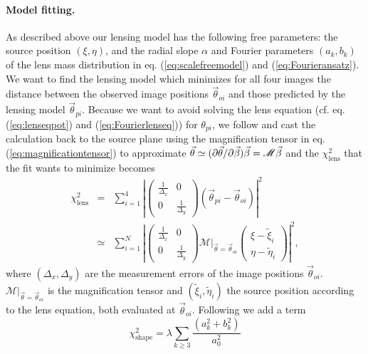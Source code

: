 \paragraph{Model fitting.} As described above our lensing model has the following free parameters: the source position $(\xi,\eta)$, and the radial slope $\alpha$ and Fourier parameters $(a_k,b_k)$ of the lens mass distribution in eq. (\ref{eq:scalefreemodel}) and (\ref{eq:Fourieransatz}). We want to find the lensing model which minimizes for all four images the distance between the observed image positions $\vec{\theta}_{oi}$ and those predicted by the lensing model $\vec{\theta}_{pi}$. Because we want to avoid solving the lens equation (cf. eq. (\ref{eq:lenseqpot}) and (\ref{eq:Fourierlenseq})) for $\theta_{pi}$, we follow \citet{1991ApJ...373..354K} and cast the calculation back to the source plane using the magnification tensor in eq. (\ref{eq:magnificationtensor}) to approximate $\vec{\theta} \simeq (\partial \vec{\theta} / \partial \vec{\beta}) \vec{\beta} = \mathscr{M} \vec{\beta} $ and the $\chi^2_\text{lens}$ that the fit wants to minimize becomes
\begin{eqnarray*}
\chi^2_\text{lens} &=& \sum_{i=1}^{4} \left|\left( \begin{matrix} \frac{1}{\Delta_x} & 0\\0 & \frac{1}{\Delta_y}\end{matrix}\right) \left( \vec{\theta}_{pi} - \vec{\theta}_{oi} \right)\right|^2\\
&\simeq& \sum_{i=1}^{N} \left|\left( \begin{matrix} \frac{1}{\Delta_x} & 0\\0 & \frac{1}{\Delta_y}\end{matrix}\right)  \left.\mathscr{M}\right|_{\vec{\theta}=\vec{\theta}_{oi}} \left( \begin{matrix} \xi - \tilde{\xi}_i \\ \eta - \tilde{\eta}_i \end{matrix} \right) \right|^2,
\end{eqnarray*}
where $(\Delta_x,\Delta_y)$ are the measurement errors of the image positions $\vec{\theta}_{oi}$. $\left.\mathscr{M}\right|_{\vec{\theta}=\vec{\theta}_{oi}}$ is the magnification tensor and $(\tilde{\xi}_i,\tilde{\eta}_i)$ the source position according to the lens equation, both evaluated at $\vec{\theta}_{oi}$. Following \citet{GlennEC} we add a term
\begin{equation*}
\chi^2_\text{shape} = \lambda \sum_{k \geq 3} \frac{\left(a_k^2 +b_k^2 \right)}{a_0^2} 
\end{equation*}
